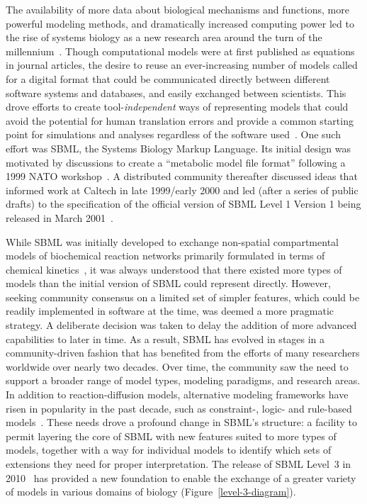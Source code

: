 \documentclass[]{draft-sbml-paper}
\begin{document}
The availability of more data about biological mechanisms and functions, more powerful modeling methods, and dramatically increased computing power led to the rise of systems biology as a new research area around the turn of the millennium~\citep{kitano2000perspectives, ideker2001new}. Though computational models were at first published as equations in journal articles, the desire to reuse an ever-increasing number of models called for a digital format that could be communicated directly between different software systems and databases, and easily exchanged between scientists. This drove efforts to create tool-\emph{independent} ways of representing models that could avoid the potential for human translation errors and provide a common starting point for simulations and analyses regardless of the software used~\citep{Lloyd2004-fd, Goddard2001-ix, hucka_2001}. One such effort was SBML, the Systems Biology Markup Language. Its initial design was motivated by discussions to create a ``metabolic model file format'' following a 1999 NATO workshop~\citep{Cornish-Bowden2000technological}. A distributed community thereafter discussed ideas that informed work at Caltech in late 1999/early 2000 and led (after a series of public drafts) to the specification of the official version of SBML Level 1 Version 1 being released in March 2001~\citep{hucka_2003}.

While SBML was initially developed to exchange non-spatial compartmental models of biochemical reaction networks primarily formulated in terms of chemical kinetics~\citep{hucka_2002}, it was always understood that there existed more types of models than the initial version of SBML could represent directly. However, seeking community consensus on a limited set of simpler features, which could be readily implemented in software at the time, was deemed a more pragmatic strategy. A deliberate decision was taken to delay the addition of more advanced capabilities to later in time.  As a result, SBML has evolved in stages in a community-driven fashion that has benefited from the efforts of many researchers worldwide over nearly two decades.  Over time, the community saw the need to support a broader range of model types, modeling paradigms, and research areas. In addition to reaction-diffusion models, alternative modeling frameworks have risen in popularity in the past decade, such as constraint-, logic- and rule-based models~\citep{Machado2011modelinga}. These needs drove a profound change in SBML's structure: a facility to permit layering the core of SBML with new features suited to more types of models, together with a way for individual models to identify which sets of extensions they need for proper interpretation. The release of SBML Level~3 in 2010~\citep{Hucka2015} has provided a new foundation to enable the exchange of a greater variety of models in various domains of biology (Figure~\ref{level-3-diagram}).
\end{document}
